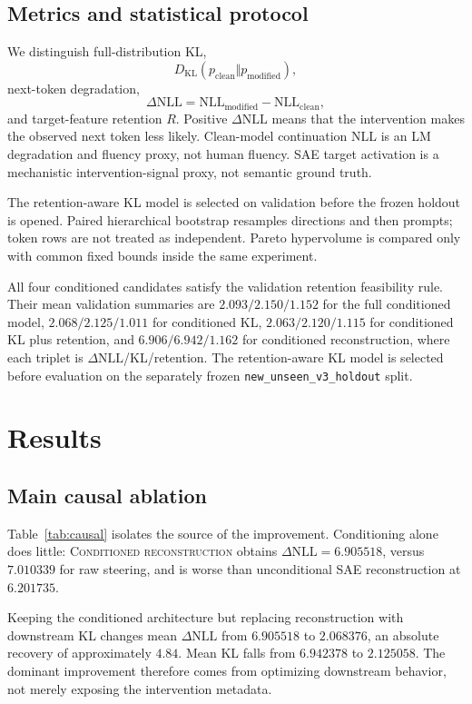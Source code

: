 \documentclass[11pt,twocolumn]{article}
\newcommand{\dNLL}{\Delta\mathrm{NLL}}
\newcommand{\KL}{D_{\mathrm{KL}}}
\newcommand{\method}[1]{\textsc{#1}}
\begin{document}
\subsection{Metrics and statistical protocol}
We distinguish full-distribution KL,
\begin{equation}
  \KL(p_{\mathrm{clean}}\Vert p_{\mathrm{modified}}),
\end{equation}
next-token degradation,
\begin{equation}
  \dNLL=\mathrm{NLL}_{\mathrm{modified}}-\mathrm{NLL}_{\mathrm{clean}},
\end{equation}
and target-feature retention $R$. Positive $\dNLL$ means that the intervention makes the observed next token less likely. Clean-model continuation NLL is an LM degradation and fluency proxy, not human fluency. SAE target activation is a mechanistic intervention-signal proxy, not semantic ground truth.

The retention-aware KL model is selected on validation before the frozen holdout is opened. Paired hierarchical bootstrap resamples directions and then prompts; token rows are not treated as independent. Pareto hypervolume is compared only with common fixed bounds inside the same experiment.

All four conditioned candidates satisfy the validation retention feasibility rule. Their mean validation summaries are $2.093/2.150/1.152$ for the full conditioned model, $2.068/2.125/1.011$ for conditioned KL, $2.063/2.120/1.115$ for conditioned KL plus retention, and $6.906/6.942/1.162$ for conditioned reconstruction, where each triplet is $\dNLL$/KL/retention. The retention-aware KL model is selected before evaluation on the separately frozen \texttt{new\_unseen\_v3\_holdout} split.

\section{Results}
\subsection{Main causal ablation}
Table~\ref{tab:causal} isolates the source of the improvement. Conditioning alone does little: \method{Conditioned reconstruction} obtains $\dNLL=6.905518$, versus $7.010339$ for raw steering, and is worse than unconditional SAE reconstruction at $6.201735$.

Keeping the conditioned architecture but replacing reconstruction with downstream KL changes mean $\dNLL$ from $6.905518$ to $2.068376$, an absolute recovery of approximately $4.84$. Mean KL falls from $6.942378$ to $2.125058$. The dominant improvement therefore comes from optimizing downstream behavior, not merely exposing the intervention metadata.
\end{document}
